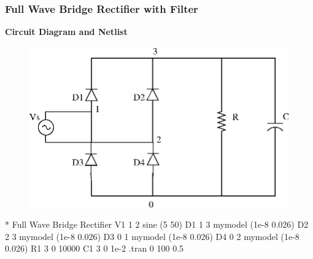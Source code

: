 \documentclass{beamer}
\begin{document}
\begin{frame}
\frametitle{Full Wave Bridge Rectifier with Filter}
\begin{minipage}[!b]{0.47\linewidth} %
  \begin{small}  {\bf Circuit Diagram and Netlist} \end{small}
\vspace{-0.5cm}
\begin{figure}[h]
\centering
\includegraphics[scale=0.47]{../figures/bridgeFilter.eps}
\end{figure}
\vspace{-0.5cm}
\begin{tiny}
* Full Wave Bridge Rectifier 
\newline
\vspace{-0.1cm}
V1 1 2 sine (5 50) 
\newline
\vspace{-0.1cm}
D1 1 3 mymodel (1e-8 0.026) 
\newline
\vspace{-0.1cm}
D2 2 3 mymodel (1e-8 0.026) 
\newline
\vspace{-0.1cm}
D3 0 1 mymodel (1e-8 0.026) 
\newline
\vspace{-0.1cm}
D4 0 2 mymodel (1e-8 0.026) 
\newline
\vspace{-0.1cm}
R1 3 0 10000 
\newline
\vspace{-0.1cm}
C1 3 0 1e-2 
\newline
\vspace{-0.1cm}
.tran 0 100 0.5 
\newline
\vspace{-0.1cm}

\end{tiny}
\end{minipage}
\end{frame}
\end{document}
